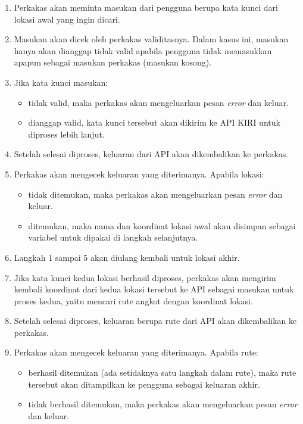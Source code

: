 \begin{enumerate}
	\item Perkakas akan meminta masukan dari pengguna berupa kata kunci dari lokasi awal yang ingin dicari.
	\item Masukan akan dicek oleh perkakas validitasnya. Dalam kasus ini, masukan hanya akan dianggap tidak valid apabila pengguna tidak memasukkan apapun sebagai masukan perkakas (masukan kosong).
	\item Jika kata kunci masukan:
	
	\begin{itemize}
		\item tidak valid, maka perkakas akan mengeluarkan pesan \textit{error} dan keluar.
		\item dianggap valid, kata kunci tersebut akan dikirim ke API KIRI untuk diproses lebih lanjut.
	\end{itemize}
	 
	\item Setelah selesai diproses, keluaran dari API akan dikembalikan ke perkakas.
	\item Perkakas akan mengecek keluaran yang diterimanya. Apabila lokasi:
	
	\begin{itemize}
		\item tidak ditemukan, maka perkakas akan mengeluarkan pesan \textit{error} dan keluar.
		\item ditemukan, maka nama dan koordinat \latlon lokasi awal akan disimpan sebagai variabel untuk dipakai di langkah selanjutnya.
	\end{itemize}
	
	\item Langkah 1 sampai 5 akan diulang kembali untuk lokasi akhir.
	\item Jika kata kunci kedua lokasi berhasil diproses, perkakas akan mengirim kembali koordinat \latlon dari kedua lokasi tersebut ke API sebagai masukan untuk proses kedua, yaitu mencari rute angkot dengan koordinat \latlon lokasi.
	\item Setelah selesai diproses, keluaran berupa rute dari API akan dikembalikan ke perkakas.
	\item Perkakas akan mengecek keluaran yang diterimanya. Apabila rute:
	
	\begin{itemize}
		\item berhasil ditemukan (ada setidaknya satu langkah dalam rute), maka rute tersebut akan ditampilkan ke pengguna sebagai keluaran akhir.
		\item tidak berhasil ditemukan, maka perkakas akan mengeluarkan pesan \textit{error} dan keluar.
	\end{itemize}
	
\end{enumerate}
